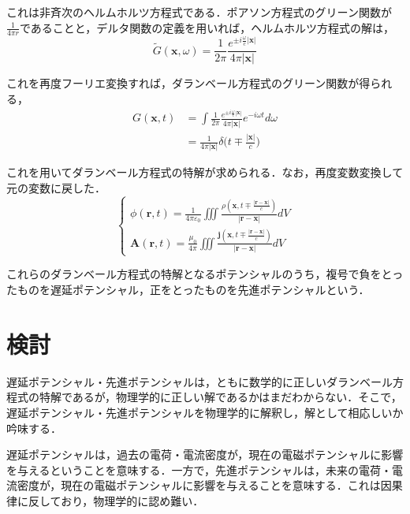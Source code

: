 \documentclass[10pt, a5paper, twoside]{jsarticle}
\theoremstyle{definition}
\begin{document}
		これは非斉次のヘルムホルツ方程式である．ポアソン方程式のグリーン関数が$\displaystyle \frac{1}{4 \pi r}$であることと，デルタ関数の定義を用いれば，ヘルムホルツ方程式の解は，
		\begin{equation*}
			\widetilde{G} (\boldsymbol{x}, \omega) = \displaystyle \frac{1}{2 \pi} \frac{e^{\pm i \frac{\omega}{c} |\boldsymbol{x}|}}{4 \pi |\boldsymbol{x}|}
		\end{equation*}

		これを再度フーリエ変換すれば，ダランベール方程式のグリーン関数が得られる，
		\begin{align*} G (\boldsymbol{x}, t) &= \int \displaystyle \frac{1}{2 \pi} \frac{e^{\pm i \frac{\omega}{c} |\boldsymbol{x}|}}{4 \pi |\boldsymbol{x}|} e^{-i \omega t} d \omega \\ &= \displaystyle \frac{1}{4 \pi |\boldsymbol{x}|} \delta \bigg(t \mp \frac{|\boldsymbol{x}|}{c} \bigg)\end{align*}

		これを用いてダランベール方程式の特解が求められる．なお，再度変数変換して元の変数に戻した．
		\begin{equation*}
			\begin{cases}
				\phi (\boldsymbol{r}, t) = \displaystyle \frac{1}{4 \pi \varepsilon_0} \iiint \frac{\rho (\boldsymbol{x}, t \mp \frac{|\boldsymbol{r} - \boldsymbol{x}|}{c})}{|\boldsymbol{r} - \boldsymbol{x}|} dV \\ \boldsymbol{A} (\boldsymbol{r}, t) = \displaystyle \frac{\mu_0}{4 \pi} \iiint \frac{\boldsymbol{j} (\boldsymbol{x}, t \mp \frac{|\boldsymbol{r} - \boldsymbol{x}|}{c})}{|\boldsymbol{r} - \boldsymbol{x}|} dV
			\end{cases}
		\end{equation*}
		
		これらのダランベール方程式の特解となるポテンシャルのうち，複号で負をとったものを遅延ポテンシャル，正をとったものを先進ポテンシャルという．

	\section{検討}

		遅延ポテンシャル・先進ポテンシャルは，ともに数学的に正しいダランベール方程式の特解であるが，物理学的に正しい解であるかはまだわからない．そこで，遅延ポテンシャル・先進ポテンシャルを物理学的に解釈し，解として相応しいか吟味する．

		遅延ポテンシャルは，過去の電荷・電流密度が，現在の電磁ポテンシャルに影響を与えるということを意味する．一方で，先進ポテンシャルは，未来の電荷・電流密度が，現在の電磁ポテンシャルに影響を与えることを意味する．これは因果律に反しており，物理学的に認め難い．
\end{document}

